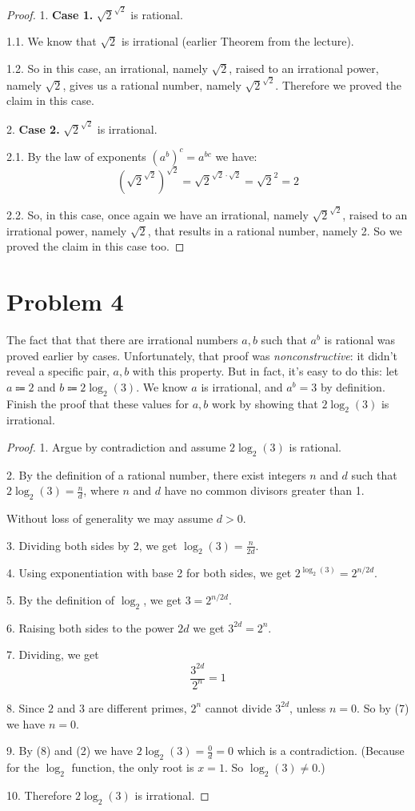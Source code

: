 \documentclass[14pt]{extarticle}
\begin{document}
\begin{proof}
1. \textbf{Case 1.} $\sqrt{2}^{\sqrt{2}}$ is rational.

1.1. We know that $\sqrt{2}$ is irrational (earlier Theorem from the lecture). 

1.2. So in this case, an irrational, namely $\sqrt{2}$, raised to an irrational power, namely $\sqrt{2}$, gives us a rational number, namely $\sqrt{2}^{\sqrt{2}}$. Therefore we proved the claim in this case.

2. \textbf{Case 2.} $\sqrt{2}^{\sqrt{2}}$ is irrational.

2.1. By the law of exponents $(a^b)^c = a^{bc}$ we have:
$$
\left(\sqrt{2}^{\sqrt{2}}\right)^{\sqrt{2}} = \sqrt{2}^{\sqrt{2} \cdot \sqrt{2}} = \sqrt{2}^2 = 2
$$

2.2. So, in this case, once again we have an irrational, namely $\sqrt{2}^{\sqrt{2}}$, raised to an irrational power, namely $\sqrt{2}$, that results in a rational number, namely 2. So we proved the claim in this case too.
\end{proof}

\section{Problem 4}

The fact that that there are irrational numbers $a, b$ such that $a^b$ is rational was proved earlier by cases. Unfortunately, that proof was {\it nonconstructive}: it didn’t reveal a specific pair, $a, b$ with this property. But in fact, it’s easy to do this: let $a \Coloneqq 2$ and $b \Coloneqq 2 \log_2(3)$. We know $a$ is irrational, and $a^b = 3$ by definition. Finish the proof that these values for $a, b$ work by showing that $2 \log_2(3)$ is irrational.

\begin{proof}
1. Argue by contradiction and assume $2\log_2(3)$ is rational.

2. By the definition of a rational number, there exist integers $n$ and $d$ such that $2\log_2(3) = \frac{n}{d}$, where $n$ and $d$ have no common divisors greater than 1. 

Without loss of generality we may assume $d > 0$.

3. Dividing both sides by 2, we get $\displaystyle \log_2(3) = \frac{n}{2d}$.

4. Using exponentiation with base 2 for both sides, we get  $2^{\log_2(3)} = 2^{n/2d}$.

5. By the definition of $\log_2$, we get $3 = 2^{n/2d}$.

6. Raising both sides to the power $2d$ we get $3^{2d} = 2^n$.

7. Dividing, we get
$$
\frac{3^{2d}}{2^n} = 1 
$$

8. Since $2$ and $3$ are different primes, $2^n$ cannot divide $3^{2d}$, unless $n = 0$. So by (7) we have $n = 0$.

9. By (8) and (2) we have $2\log_2(3) = \frac{0}{d} = 0$ which is a contradiction. (Because for the $\log_2$ function, the only root is $x = 1$. So $\log_2(3) \neq 0$.)

10. Therefore $2\log_2(3)$ is irrational.
\end{proof}
\end{document}
